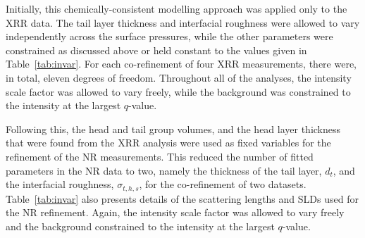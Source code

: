 Initially, this chemically-consistent modelling approach was applied only to the XRR data.
The tail layer thickness and interfacial roughness were allowed to vary independently across the surface pressures, while the other parameters were constrained as discussed above or held constant to the values given in Table~\ref{tab:invar}.
For each co-refinement of four XRR measurements, there were, in total, eleven degrees of freedom.
Throughout all of the analyses, the intensity scale factor was allowed to vary freely, while the background was constrained to the intensity at the largest $q$-value.

Following this, the head and tail group volumes, and the head layer thickness that were found from the XRR analysis were used as fixed variables for the refinement of the NR measurements.
This reduced the number of fitted parameters in the NR data to two, namely the thickness of the tail layer, $d_t$, and the interfacial roughness, $\sigma_{t,h,s}$, for the co-refinement of two datasets.
Table~\ref{tab:invar} also presents details of the scattering lengths and SLDs used for the NR refinement.
Again, the intensity scale factor was allowed to vary freely and the background constrained to the intensity at the largest $q$-value.

